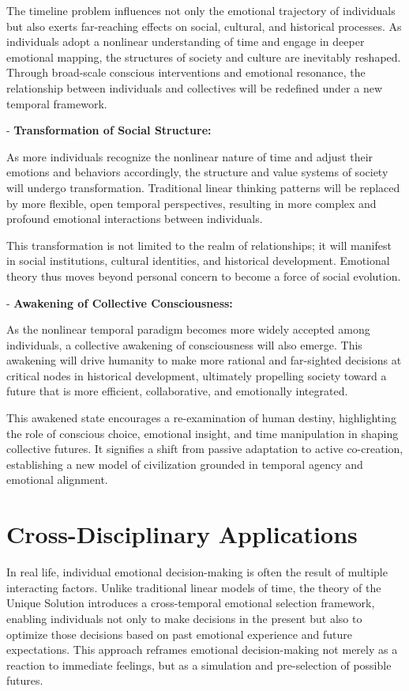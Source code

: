 \documentclass{article}
\begin{document}
The timeline problem influences not only the emotional trajectory of individuals but also exerts far-reaching effects on social, cultural, and historical processes. As individuals adopt a nonlinear understanding of time and engage in deeper emotional mapping, the structures of society and culture are inevitably reshaped. Through broad-scale conscious interventions and emotional resonance, the relationship between individuals and collectives will be redefined under a new temporal framework.

- \textbf{Transformation of Social Structure:}

As more individuals recognize the nonlinear nature of time and adjust their emotions and behaviors accordingly, the structure and value systems of society will undergo transformation. Traditional linear thinking patterns will be replaced by more flexible, open temporal perspectives, resulting in more complex and profound emotional interactions between individuals.

This transformation is not limited to the realm of relationships; it will manifest in social institutions, cultural identities, and historical development. Emotional theory thus moves beyond personal concern to become a force of social evolution.

- \textbf{Awakening of Collective Consciousness:}

As the nonlinear temporal paradigm becomes more widely accepted among individuals, a collective awakening of consciousness will also emerge. This awakening will drive humanity to make more rational and far-sighted decisions at critical nodes in historical development, ultimately propelling society toward a future that is more efficient, collaborative, and emotionally integrated.

This awakened state encourages a re-examination of human destiny, highlighting the role of conscious choice, emotional insight, and time manipulation in shaping collective futures. It signifies a shift from passive adaptation to active co-creation, establishing a new model of civilization grounded in temporal agency and emotional alignment.

\section{Cross-Disciplinary Applications}

In real life, individual emotional decision-making is often the result of multiple interacting factors. Unlike traditional linear models of time, the theory of the Unique Solution introduces a cross-temporal emotional selection framework, enabling individuals not only to make decisions in the present but also to optimize those decisions based on past emotional experience and future expectations. This approach reframes emotional decision-making not merely as a reaction to immediate feelings, but as a simulation and pre-selection of possible futures.
\end{document}
